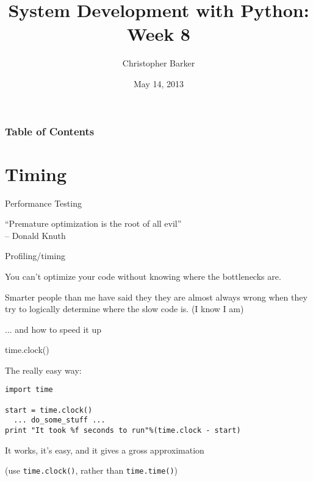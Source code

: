 \documentclass{beamer}
\title[Python Certificate: System Development]{System Development with Python: Week 8}
\author{Christopher Barker}
\institute{UW Continuing Education}
\date{May 14, 2013}
\begin{document}
\begin{frame}
  \titlepage
\end{frame}

\begin{frame}
\frametitle{Table of Contents}
  \tableofcontents
\end{frame}


\section{Timing}

\begin{frame}[fragile]{Performance Testing}

{\Large ``Premature optimization is the root of all evil''}\\[0.1in]
{\large \hspace{0.5in} -- Donald Knuth}

\end{frame} 

\begin{frame}[fragile]{Profiling/timing}

\vfill
{\Large You can't optimize your code without knowing where the bottlenecks are.}

\vfill
{\Large Smarter people than me have said they they are almost always wrong
when they try to logically determine where the slow code is. (I know I am)}

\vfill
{\Large ... and how to speed it up}

\end{frame} 

\begin{frame}[fragile]{time.clock()}

{\Large The really easy way:}

\begin{verbatim}
import time

start = time.clock()
  ... do_some_stuff ...
print "It took %f seconds to run"%(time.clock - start)
\end{verbatim}

{\Large It works, it's easy, and it gives a gross approximation}

\vfill
(use \verb|time.clock()|, rather than \verb|time.time()|)

\end{frame} 
\end{document}
